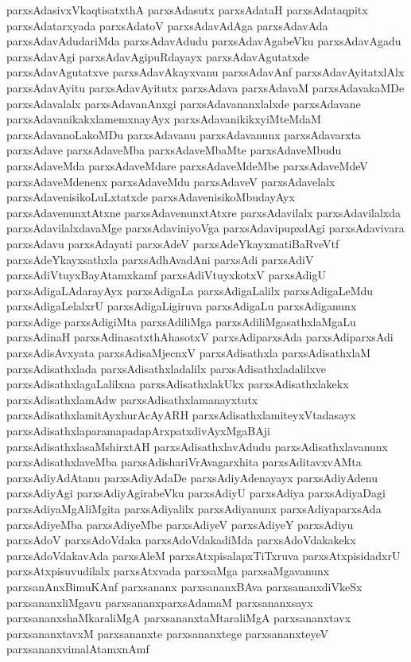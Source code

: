 {parxsAdasivxVkaqtisatxthA
parxsAdasutx
parxsAdataH
parxsAdataqpitx
parxsAdatarxyada
parxsAdatoV
parxsAdavAdAga
parxsAdavAda
parxsAdavAdudariMda
parxsAdavAdudu
parxsAdavAgabeVku
parxsAdavAgadu
parxsAdavAgi
parxsAdavAgipuRdayayx
parxsAdavAgutatxde
parxsAdavAgutatxve
parxsAdavAkayxvanu
parxsAdavAnf
parxsAdavAyitatxlAlx
parxsAdavAyitu
parxsAdavAyitutx
parxsAdava
parxsAdavaM
parxsAdavakaMDe
parxsAdavalalx
parxsAdavanAnxgi
parxsAdavananxlalxde
parxsAdavane
parxsAdavanikakxlamemxnayAyx
parxsAdavanikikxyiMteMdaM
parxsAdavanoLakoMDu
parxsAdavanu
parxsAdavanunx
parxsAdavarxta
parxsAdave
parxsAdaveMba
parxsAdaveMbaMte
parxsAdaveMbudu
parxsAdaveMda
parxsAdaveMdare
parxsAdaveMdeMbe
parxsAdaveMdeV
parxsAdaveMdenenx
parxsAdaveMdu
parxsAdaveV
parxsAdavelalx
parxsAdavenisikoLuLxtatxde
parxsAdavenisikoMbudayAyx
parxsAdavenunxtAtxne
parxsAdavenunxtAtxre
parxsAdavilalx
parxsAdavilalxda
parxsAdavilalxdavaMge
parxsAdaviniyoVga
parxsAdavipupxdAgi
parxsAdavivara
parxsAdavu
parxsAdayati
parxsAdeV
parxsAdeYkayxmatiBaRveVtf
parxsAdeYkayxsathxla
parxsAdhAvadAni
parxsAdi
parxsAdiV
parxsAdiVtuyxBayAtamxkamf
parxsAdiVtuyxkotxV
parxsAdigU
parxsAdigaLAdarayAyx
parxsAdigaLa
parxsAdigaLalilx
parxsAdigaLeMdu
parxsAdigaLelalxrU
parxsAdigaLigiruva
parxsAdigaLu
parxsAdiganunx
parxsAdige
parxsAdigiMta
parxsAdiliMga
parxsAdiliMgasathxlaMgaLu
parxsAdinaH
parxsAdinasatxthAhasotxV
parxsAdiparxsAda
parxsAdiparxsAdi
parxsAdisAvxyata
parxsAdisaMjecnxV
parxsAdisathxla
parxsAdisathxlaM
parxsAdisathxlada
parxsAdisathxladalilx
parxsAdisathxladalilxve
parxsAdisathxlagaLalilxna
parxsAdisathxlakUkx
parxsAdisathxlakekx
parxsAdisathxlamAdw
parxsAdisathxlamanayxtutx
parxsAdisathxlamitAyxhurAcAyARH
parxsAdisathxlamiteyxVtadasayx
parxsAdisathxlaparamapadapArxpatxdivAyxMgaBAji
parxsAdisathxlasaMshirxtAH
parxsAdisathxlavAdudu
parxsAdisathxlavanunx
parxsAdisathxlaveMba
parxsAdishariVrAvagarxhita
parxsAditavxvAMta
parxsAdiyAdAtanu
parxsAdiyAdaDe
parxsAdiyAdenayayx
parxsAdiyAdenu
parxsAdiyAgi
parxsAdiyAgirabeVku
parxsAdiyU
parxsAdiya
parxsAdiyaDagi
parxsAdiyaMgAliMgita
parxsAdiyalilx
parxsAdiyanunx
parxsAdiyaparxsAda
parxsAdiyeMba
parxsAdiyeMbe
parxsAdiyeV
parxsAdiyeY
parxsAdiyu
parxsAdoV
parxsAdoVdaka
parxsAdoVdakadiMda
parxsAdoVdakakekx
parxsAdoVdakavAda
parxsAleM
parxsAtxpisalapxTiTxruva
parxsAtxpisidadxrU
parxsAtxpisuvudilalx
parxsAtxvada
parxsaMga
parxsaMgavanunx
parxsanAnxBimuKAnf
parxsananx
parxsananxBAva
parxsananxdiVkeSx
parxsananxliMgavu
parxsananxparxsAdamaM
parxsananxsayx
parxsananxshaMkaraliMgA
parxsananxtaMtaraliMgA
parxsananxtavx
parxsananxtavxM
parxsananxte
parxsananxtege
parxsananxteyeV
parxsananxvimalAtamxnAmf
}
